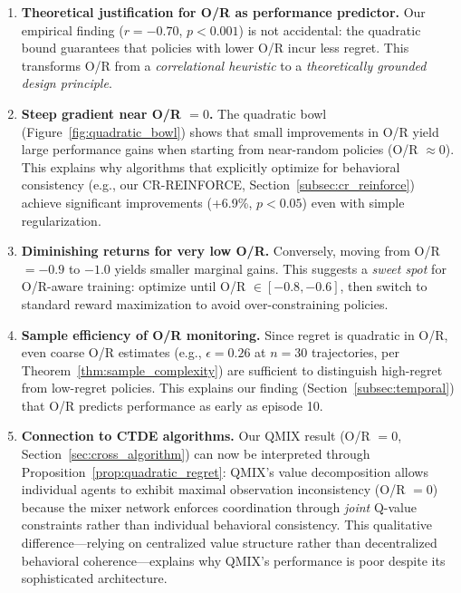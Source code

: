 \begin{enumerate}
    \item \textbf{Theoretical justification for O/R as performance predictor.} Our empirical finding ($r = -0.70$, $p < 0.001$) is not accidental: the quadratic bound guarantees that policies with lower O/R incur less regret. This transforms O/R from a \textit{correlational heuristic} to a \textit{theoretically grounded design principle}.

    \item \textbf{Steep gradient near O/R $= 0$.} The quadratic bowl (Figure~\ref{fig:quadratic_bowl}) shows that small improvements in O/R yield large performance gains when starting from near-random policies (O/R $\approx 0$). This explains why algorithms that explicitly optimize for behavioral consistency (e.g., our CR-REINFORCE, Section~\ref{subsec:cr_reinforce}) achieve significant improvements (+6.9\%, $p < 0.05$) even with simple regularization.

    \item \textbf{Diminishing returns for very low O/R.} Conversely, moving from O/R $= -0.9$ to $-1.0$ yields smaller marginal gains. This suggests a \textit{sweet spot} for O/R-aware training: optimize until O/R $\in [-0.8, -0.6]$, then switch to standard reward maximization to avoid over-constraining policies.

    \item \textbf{Sample efficiency of O/R monitoring.} Since regret is quadratic in O/R, even coarse O/R estimates (e.g., $\epsilon = 0.26$ at $n=30$ trajectories, per Theorem~\ref{thm:sample_complexity}) are sufficient to distinguish high-regret from low-regret policies. This explains our finding (Section~\ref{subsec:temporal}) that O/R predicts performance as early as episode 10.

    \item \textbf{Connection to CTDE algorithms.} Our QMIX result (O/R $= 0$, Section~\ref{sec:cross_algorithm}) can now be interpreted through Proposition~\ref{prop:quadratic_regret}: QMIX's value decomposition allows individual agents to exhibit maximal observation inconsistency (O/R $= 0$) because the mixer network enforces coordination through \textit{joint} Q-value constraints rather than individual behavioral consistency. This qualitative difference—relying on centralized value structure rather than decentralized behavioral coherence—explains why QMIX's performance is poor despite its sophisticated architecture.
\end{enumerate}

